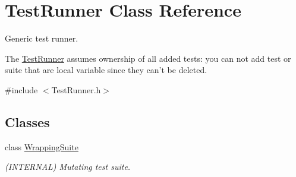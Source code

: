 \hypertarget{class_test_runner}{\section{Test\-Runner Class Reference}
\label{class_test_runner}
}


Generic test runner.

The \hyperlink{class_test_runner}{Test\-Runner} assumes ownership of all added tests\-: you can not add test or suite that are local variable since they can't be deleted.  




{\ttfamily \#include $<$Test\-Runner.\-h$>$}

\subsection*{Classes}
\begin{DoxyCompactItemize}
\item 
class \hyperlink{class_test_runner_1_1_wrapping_suite}{Wrapping\-Suite}
\begin{DoxyCompactList}\small\item\em (I\-N\-T\-E\-R\-N\-A\-L) Mutating test suite. \end{DoxyCompactList}\end{DoxyCompactItemize}

